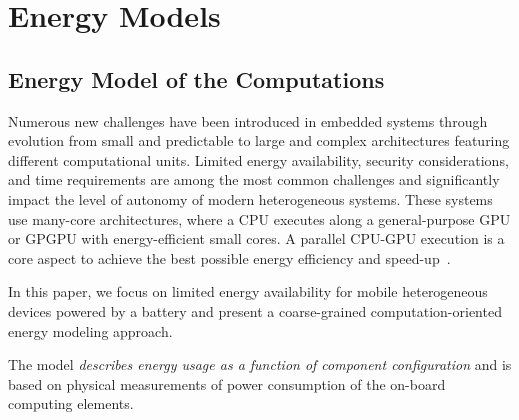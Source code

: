
\chapter{\color{red}Energy Models}
\label{cp:model}



\section{\color{cyan}Energy Model of the Computations}
\label{sec:comp-ener-model}

Numerous new challenges have been introduced in embedded systems through evolution from small and predictable to large and complex architectures featuring different computational units. Limited energy availability, security considerations, and time requirements are among the most common challenges and significantly impact the level of autonomy of modern heterogeneous systems. These systems use many-core architectures, where a CPU executes along a general-purpose GPU or GPGPU with energy-efficient small cores. A parallel CPU-GPU execution is a core aspect to achieve the best possible energy efficiency and speed-up~\citep{woo2008extending}.%
%

In this paper, we focus on limited energy availability for mobile heterogeneous devices powered by a battery and present a coarse-grained computation-oriented energy modeling approach. 
%

The model \textit{describes energy usage as a function of component configuration} and is based on physical measurements of power consumption of the on-board computing elements.
%

